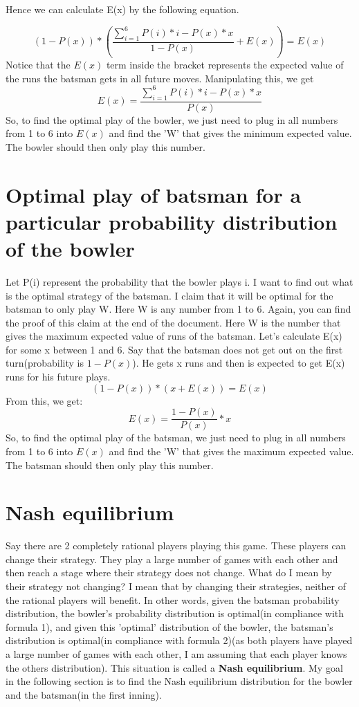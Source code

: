 \documentclass{article}
\begin{document}
Hence we can calculate E(x) by the following equation.

$$(1 - P(x))*\left(\frac{\sum_{i = 1}^6P(i)*i - P(x)*x}{1 - P(x)} + E(x)\right) = E(x)$$
Notice that the $E(x)$ term inside the bracket represents the expected value of the runs the batsman gets in all future moves.
Manipulating this, we get
\begin{equation}E(x) = \frac{\sum_{i = 1}^6P(i)*i - P(x)*x}
{P(x)}\end{equation}
So, to find the optimal play of the bowler, we just need to plug in all numbers from 1 to 6 into $E(x)$ and find the 'W' that gives the minimum expected value. The bowler should then only play this number.
\section{Optimal play of batsman for a particular probability distribution of the bowler}
Let P(i) represent the probability that the bowler plays i. I want to find out what is the optimal strategy of the batsman. I claim that it will be optimal for the batsman to only play W. Here W is any number from 1 to 6. Again, you can find the proof of this claim at the end of the document. Here W is the number that gives the maximum expected value of runs of the batsman. Let's calculate E(x) for some x between 1 and 6. Say that the batsman does not get out on the first turn(probability is $1 - P(x)$). He gets x runs and then is expected to get E(x) runs for his future plays.
$$\left(1 - P(x)\right)*(x + E(x))= E(x)$$
From this, we get:
\begin{equation}E(x) = \frac{1 - P(x)}{P(x)}*x\end{equation}
So, to find the optimal play of the batsman, we just need to plug in all numbers from 1 to 6 into $E(x)$ and find the 'W' that gives the maximum expected value. The batsman should then only play this number.
\section *{Nash equilibrium}

Say there are 2 completely rational players playing this game. These players can change their strategy. They play a large number of games with each other and then reach a stage where their strategy does not change. What do I mean by their strategy not changing? I mean that by changing their strategies, neither of the rational players will benefit. In other words, given the batsman probability distribution, the bowler's probability distribution is optimal(in compliance with formula 1), and given this 'optimal' distribution of the bowler, the batsman's distribution is optimal(in compliance with formula 2)(as both players have played a large number of games with each other, I am assuming that each player knows the others distribution). This situation is called a \textbf{Nash equilibrium}. My goal in the following section is to find the Nash equilibrium distribution for the bowler and the batsman(in the first inning).
\end{document}
